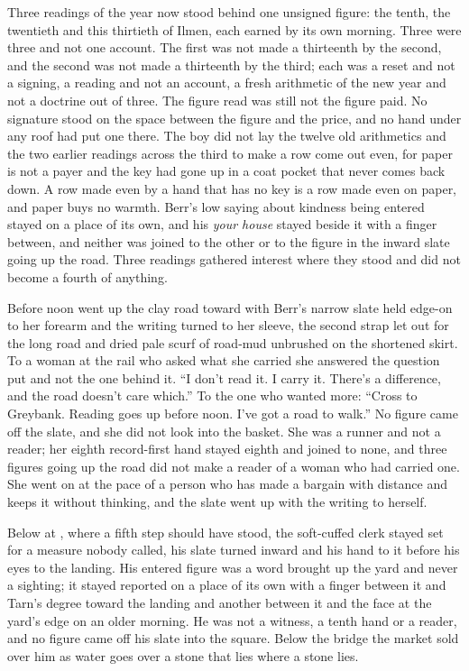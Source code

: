 Three readings of the year now stood behind one unsigned figure: the tenth, the twentieth and this thirtieth of Ilmen, each earned by its own morning. Three were three and not one account. The first was not made a thirteenth by the second, and the second was not made a thirteenth by the third; each was a reset and not a signing, a reading and not an account, a fresh arithmetic of the new year and not a doctrine out of three. The figure read was still not the figure paid. No signature stood on the space between the figure and the price, and no hand under any roof had put one there. The boy did not lay the twelve old arithmetics and the two earlier readings across the third to make a row come out even, for paper is not a payer and the key had gone up in a coat pocket that never comes back down. A row made even by a hand that has no key is a row made even on paper, and paper buys no warmth. Berr's low saying about kindness being entered stayed on a place of its own, and his \emph{your house} stayed beside it with a finger between, and neither was joined to the other or to the figure in the inward slate going up the road. Three readings gathered interest where they stood and did not become a fourth of anything.

Before noon  went up the clay road toward  with Berr's narrow slate held edge-on to her forearm and the writing turned to her sleeve, the second strap let out for the long road and dried pale scurf of road-mud unbrushed on the shortened skirt. To a woman at the rail who asked what she carried she answered the question put and not the one behind it. “I don't read it. I carry it. There's a difference, and the road doesn't care which.” To the one who wanted more: “Cross to Greybank. Reading goes up before noon. I've got a road to walk.” No figure came off the slate, and she did not look into the basket. She was a runner and not a reader; her eighth record-first hand stayed eighth and joined to none, and three figures going up the road did not make a reader of a woman who had carried one. She went on at the pace of a person who has made a bargain with distance and keeps it without thinking, and the slate went up with the writing to herself.

Below  at , where a fifth step should have stood, the soft-cuffed clerk stayed set for a measure nobody called, his slate turned inward and his hand to it before his eyes to the landing. His entered figure was a word brought up the yard and never a sighting; it stayed reported on a place of its own with a finger between it and Tarn's degree toward the landing and another between it and the face at the yard's edge on an older morning. He was not a witness, a tenth hand or a reader, and no figure came off his slate into the square. Below the bridge the market sold over him as water goes over a stone that lies where a stone lies.


